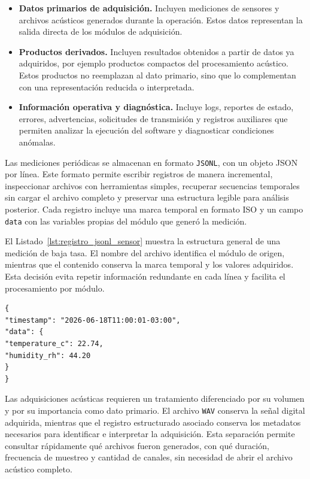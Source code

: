 \begin{itemize}
\item \textbf{Datos primarios de adquisición.} Incluyen mediciones de sensores y archivos acústicos generados durante la operación. Estos datos representan la salida directa de los módulos de adquisición.

\item \textbf{Productos derivados.} Incluyen resultados obtenidos a partir de datos ya adquiridos, por ejemplo productos compactos del procesamiento acústico. Estos productos no reemplazan al dato primario, sino que lo complementan con una representación reducida o interpretada.

\item \textbf{Información operativa y diagnóstica.} Incluye logs, reportes de estado, errores, advertencias, solicitudes de transmisión y registros auxiliares que permiten analizar la ejecución del software y diagnosticar condiciones anómalas.

\end{itemize}

Las mediciones periódicas se almacenan en formato \texttt{JSONL}, con un objeto JSON por línea. Este formato permite escribir registros de manera incremental, inspeccionar archivos con herramientas simples, recuperar secuencias temporales sin cargar el archivo completo y preservar una estructura legible para análisis posterior. Cada registro incluye una marca temporal en formato ISO y un campo \texttt{data} con las variables propias del módulo que generó la medición.

El Listado~\ref{lst:registro_jsonl_sensor} muestra la estructura general de una medición de baja tasa. El nombre del archivo identifica el módulo de origen, mientras que el contenido conserva la marca temporal y los valores adquiridos. Esta decisión evita repetir información redundante en cada línea y facilita el procesamiento por módulo.

\begin{lstlisting}[style=pseudocodigo, caption={Estructura general de una medición persistida en formato \texttt{JSONL}.}, label={lst:registro_jsonl_sensor}]
{
"timestamp": "2026-06-18T11:00:01-03:00",
"data": {
"temperature_c": 22.74,
"humidity_rh": 44.20
}
}
\end{lstlisting}

Las adquisiciones acústicas requieren un tratamiento diferenciado por su volumen y por su importancia como dato primario. El archivo \texttt{WAV} conserva la señal digital adquirida, mientras que el registro estructurado asociado conserva los metadatos necesarios para identificar e interpretar la adquisición. Esta separación permite consultar rápidamente qué archivos fueron generados, con qué duración, frecuencia de muestreo y cantidad de canales, sin necesidad de abrir el archivo acústico completo.

